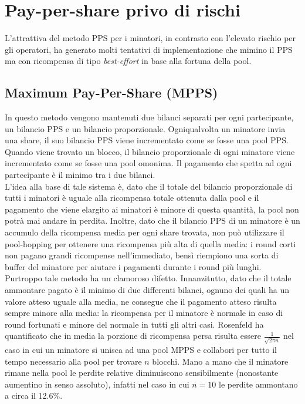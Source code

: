

\section{Pay-per-share privo di rischi}\label{pool-famiglia-mpps}

L'attrattiva del metodo PPS per i minatori, in contrasto con l'elevato rischio per gli operatori, ha generato molti tentativi di implementazione che mimino il PPS ma con ricompensa di tipo \emph{best-effort} in base alla fortuna della pool.

\subsection{Maximum Pay-Per-Share (MPPS)}

In questo metodo vengono mantenuti due bilanci separati per ogni partecipante, un bilancio PPS e un bilancio proporzionale. Ogniqualvolta un minatore invia una share, il suo bilancio PPS viene incrementato come se fosse una pool PPS. Quando viene trovato un blocco, il bilancio proporzionale di ogni minatore viene incrementato come se fosse una pool omonima. Il pagamento che spetta ad ogni partecipante è il minimo tra i due bilanci.\\
L'idea alla base di tale sistema è, dato che il totale del bilancio proporzionale di tutti i minatori è uguale alla ricompensa totale ottenuta dalla pool e il pagamento che viene elargito ai minatori è minore di questa quantità, la pool non potrà mai andare in perdita. Inoltre, dato che il bilancio PPS di un minatore è un accumulo della ricompensa media per ogni share trovata, non può utilizzare il pool-hopping per ottenere una ricompensa più alta di quella media: i round corti non pagano grandi ricompense nell'immediato, bensì riempiono una sorta di buffer del minatore per aiutare i pagamenti durante i round più lunghi.
Purtroppo tale metodo ha un clamoroso difetto. Innanzitutto, dato che il totale ammontare pagato è il minimo di due differenti bilanci, ognuno dei quali ha un valore atteso uguale alla media, ne consegue che il pagamento atteso risulta sempre minore alla media: la ricompensa per il minatore è normale in caso di round fortunati e minore del normale in tutti gli altri casi.
Rosenfeld ha quantificato che in media la porzione di ricompensa persa risulta essere $\frac{1}{\sqrt{2\pi n}}$ nel caso in cui un minatore si unisca ad una pool MPPS e collabori per tutto il tempo necessario alla pool per trovare $n$ blocchi. Mano a mano che il minatore rimane nella pool le perdite relative diminuiscono sensibilmente (nonostante aumentino in senso assoluto), infatti nel caso in cui $n=10$ le perdite ammontano a circa il 12.6\%.

